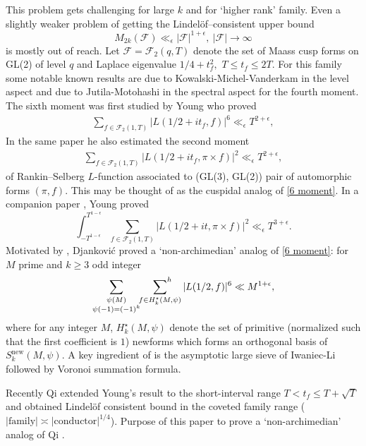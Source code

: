 \documentclass[12pt,a4paper,twoside, reqno]{amsart}
\begin{document}
This problem gets challenging for large $k$ and for `higher rank' family. Even a  slightly weaker  problem  of  getting  the  Lindel\"of--consistent upper bound $$M_{2k}(\mathcal{F}) \ll_\epsilon |\mathcal{F}|^{1+\epsilon},  \ |\mathcal{F}| \rightarrow \infty $$ is mostly out of reach.   
Let $\mathcal{F}= \mathcal{F}_2(q, T)  $  denote the set of    Maass cusp  forms  on  GL(2)  of  level $q$   and Laplace eigenvalue $1/4+t_f^2, $  $  T\leq t_f\leq 2T$. For this family
some  notable known results  are  due to Kowalski-Michel-Vanderkam \cite{KMV00} in the level aspect and due to Jutila-Motohashi \cite{JM06}  in the spectral aspect    for the fourth moment.
The sixth moment was first studied by Young \cite{MY09} who proved 
\begin{align}\label{6 moment}
    \sum_{f \in \mathcal{F}_2(1,T)} |L(1/2+it_f,f)|^6 \ll_\epsilon T^{2+\epsilon},
\end{align}
In the same paper  he also estimated  the second moment 
\begin{align*}
    \sum_{f \in \mathcal{F}_2(1,T)} |L(1/2+it_f,\pi \times f)|^2\ll_\epsilon T^{2+\epsilon},
\end{align*}
of  Rankin--Selberg $L$-function associated to (GL(3), GL(2)) pair of automorphic forms $(\pi,f)$. This may be thought of as the cuspidal analog of  \eqref{6 moment}. In a companion paper \cite{MY11}, Young proved 
\[\int_{-T^{1-\epsilon}}^{T^{1-\epsilon}}\sum_{f \in \mathcal{F}_2(1,T)} |L(1/2+it,\pi \times f)|^2\ll_\epsilon T^{3+\epsilon}.\]
Motivated by \cite{MY11}, Djankovi\'c \cite{D11} proved a `non-archimedian' analog of \eqref{6 moment}: for $M$ prime and $k\geq 3$ odd integer 
\[  \mathop{ \sum_{\substack{\psi(M) \\ \psi(-1)=(-1)^k }}} \sideset{}{^h}\sum_{f \in H_k^{\star}(M,\psi)} |L(1/2,  f)|^6 \ll M^{1+\epsilon},\]
where  for any integer $M$, $ H_k^\star(M, \psi)$ denote the set
of primitive (normalized such that the first coefficient is  $1$) newforms   which forms an orthogonal basis of $S_k^{\mathrm{new}}(M, \psi)$.   A key ingredient of  \cite{D11} is the asymptotic large sieve of Iwaniec-Li \cite{IL07} followed by Voronoi summation formula.  

Recently Qi \cite{Qi25} extended Young's result \cite{MY09} to the short-interval range $ T < t_f \leq T+\sqrt{T}$ and obtained Lindel\"of consistent bound in the coveted family range ($ |\mathrm{family}| \asymp \mathrm{|conductor|}^{1/4}$). Purpose of this paper to prove a `non-archimedian' analog of Qi \cite{Qi25}. 
\end{document}
